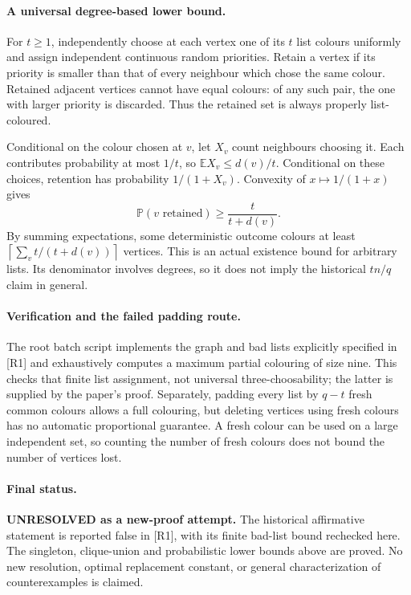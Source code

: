 \documentclass[11pt,a4paper]{article}
\begin{document}
\paragraph{A universal degree-based lower bound.}
For $t\ge1$, independently choose at each vertex one of its $t$ list
colours uniformly and assign independent continuous random priorities.
Retain a vertex if its priority is smaller than that of every neighbour
which chose the same colour. Retained adjacent vertices cannot have equal
colours: of any such pair, the one with larger priority is discarded.
Thus the retained set is always properly list-coloured.

Conditional on the colour chosen at $v$, let $X_v$ count neighbours
choosing it. Each contributes probability at most $1/t$, so
$\mathbb E X_v\le d(v)/t$. Conditional on these choices, retention has
probability $1/(1+X_v)$. Convexity of $x\mapsto1/(1+x)$ gives
\[
 \mathbb P(v\text{ retained})\ge\frac{t}{t+d(v)}.
\]
By summing expectations, some deterministic outcome colours at least
$\left\lceil\sum_v t/(t+d(v))\right\rceil$ vertices. This is an actual
existence bound for arbitrary lists. Its denominator involves degrees,
so it does not imply the historical $tn/q$ claim in general.

\paragraph{Verification and the failed padding route.}
The root batch script implements the graph and bad lists explicitly
specified in [R1] and exhaustively computes a maximum partial colouring
of size nine. This checks that finite list assignment, not universal
three-choosability; the latter is supplied by the paper's proof.
Separately, padding every list by $q-t$ fresh common colours allows a
full colouring, but deleting vertices using fresh colours has no automatic
proportional guarantee. A fresh colour can be used on a large independent
set, so counting the number of fresh colours does not bound the number
of vertices lost.

\paragraph{Final status.}
\textbf{UNRESOLVED as a new-proof attempt.} The historical affirmative
statement is reported false in [R1], with its finite bad-list bound
rechecked here. The singleton, clique-union and probabilistic lower bounds
above are proved. No new resolution, optimal replacement constant, or
general characterization of counterexamples is claimed.
\end{document}

